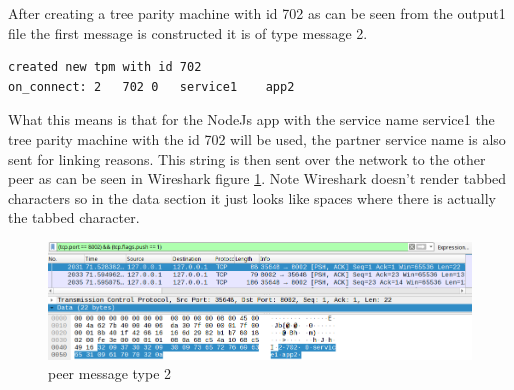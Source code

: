 After creating a tree parity machine with id 702 as can be seen from the output1 file the first message is constructed it is of type message 2.
\begin{lstlisting}
created new tpm with id 702
on_connect: 2	702	0	service1	app2
\end{lstlisting}
What this means is that for the NodeJs app with the service name service1 the tree parity machine with the id 702 will be used, the partner service name is also sent for linking reasons. 
This string is then sent over the network to the other peer as can be seen in Wireshark figure \ref{fig:sync3}. Note Wireshark doesn't render tabbed characters so in the data section it just looks like spaces where there is actually the tabbed character.
\begin{figure}[!h]
	\centering
	\includegraphics[width=1\textwidth]{Figures/sync3.png}
	\caption[peer message type 2]{peer message type 2}
	\label{fig:sync3}
\end{figure}
\FloatBarrier

